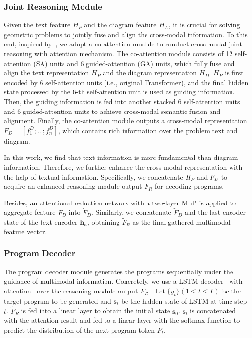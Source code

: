 \documentclass[11pt,a4paper]{article}
\begin{document}
\subsubsection{Joint Reasoning Module}
Given the text feature $H_P$ and the diagram feature $H_D$, it is crucial for solving geometric problems to jointly fuse and align the cross-modal information.
To this end, inspired by~\citet{yu2019deep}, we adopt a co-attention module to conduct cross-modal joint reasoning with attention mechanism.  
The co-attention module consists of 12 self-attention (SA) units and 6 guided-attention (GA) units, which fully fuse and align the text representation $H_P$ and the diagram representation $H_D$. 
$H_P$ is first encoded by 6 self-attention units (i.e., original Transformer), and the final hidden state processed by the 6-th self-attention unit is used as guiding information. 
Then, the guiding information is fed into another stacked 6 self-attention units and 6 guided-attention units to achieve cross-modal semantic fusion and alignment.
Finally, the co-attention module outputs a cross-modal representation $F_D=[f^D_1;...;f^D_n]$, which contains rich information over the problem text and diagram. 

In this work, we find that text information is more fundamental than diagram information. Therefore, we further enhance the cross-modal representation with the help of textual information. Specifically, we concatenate $H_P$ and $F_D$ to acquire an enhanced reasoning module output $F_R$ for decoding programs.


Besides, an attentional reduction network with a two-layer MLP is applied to aggregate feature $F_D$ 
into $\tilde{F}_D$.
Similarly, we concatenate $\tilde{F}_D$ and the last encoder state of the text encoder $\bm h_n$, obtaining $\tilde{F}_R$ as the final gathered multimodal feature vector.


\subsubsection{Program Decoder}


The program decoder module generates the programs sequentially under the guidance of multimodal information. Concretely, we use a LSTM decoder~\cite{LSTM} with attention~\cite{bahdanau2014neural} over the reasoning module output $F_R$ . Let $\{y_t\} (1\leq t \leq T)$ be the target program to be generated and $\bm s_t$ be the hidden state of LSTM at time step $t$. $\tilde{F}_R$ is fed into a linear layer to obtain the initial state $\bm s_0$. $\bm s_t$ is concatenated with the attention result and fed to a linear layer with the softmax function to predict the distribution of the next program token $P_t$.
\end{document}
